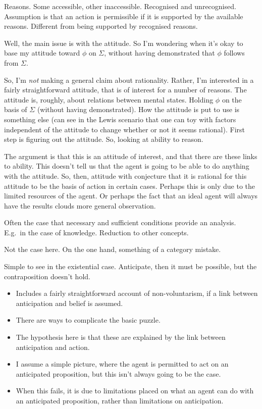 \documentclass[10pt]{article}
\begin{document}
{{    Reasons.
    Some accessible, other inaccessible.
    Recognised and unrecognised.
    Assumption is that an action is permissible if it is supported by the available reasons.
    Different from being supported by recognised reasons.

    Well, the main issue is with the attitude.
    So I'm wondering when it's okay to base my attitude toward \(\phi\) on \(\Sigma\), without having demonstrated that \(\phi\) follows from \(\Sigma\).

    So, I'm \emph{not} making a general claim about rationality.
    Rather, I'm interested in a fairly straightforward attitude, that is of interest for a number of reasons.
    The attitude is, roughly, about relations between mental states.
    Holding \(\phi\) on the basis of \(\Sigma\) (without having demonstrated).
    How the attitude is put to use is something else (can see in the Lewis scenario that one can toy with factors independent of the attitude to change whether or not it seems rational).
    First step is figuring out the attitude.
    So, looking at ability to reason.

    The argument is that this is an attitude of interest, and that there are these links to ability.
    This doesn't tell us that the agent is going to be able to do anything with the attitude.
    So, then, attitude with conjecture that it is rational for this attitude to be the basis of action in certain cases.
    Perhaps this is only due to the limited resources of the agent.
    Or perhaps the fact that an ideal agent will always have the results clouds more general observation.
    
  }


  
  Often the case that necessary and sufficient conditions provide an analysis.
  E.g.\ in the case of knowledge.
  Reduction to other concepts.

  Not the case here.
  On the one hand, something of a category mistake.
  

  Simple to see in the existential case.
  Anticipate, then it must be possible, but the contraposition doesn't hold.
}


\begin{itemize}
\item Includes a fairly straightforward account of non-voluntarism, if a link between anticipation and belief is assumed.
\end{itemize}


\begin{itemize}
\item There are ways to complicate the basic puzzle.
\item The hypothesis here is that these are explained by the link between anticipation and action.
\item I assume a simple picture, where the agent is permitted to act on an anticipated proposition, but this isn't always going to be the case.
\item When this fails, it is due to limitations placed on what an agent can do with an anticipated proposition, rather than limitations on anticipation.
\end{itemize}
\end{document}
